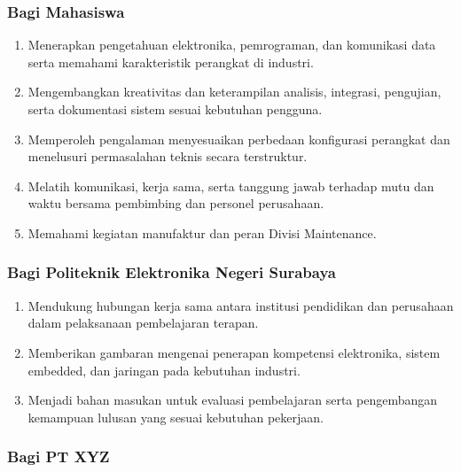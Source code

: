 \subsubsection{Bagi Mahasiswa}

\begin{enumerate}[leftmargin=*,itemsep=2pt]
\item Menerapkan pengetahuan elektronika, pemrograman, dan komunikasi data serta memahami karakteristik perangkat di industri.

\item Mengembangkan kreativitas dan keterampilan analisis, integrasi, pengujian, serta dokumentasi sistem sesuai kebutuhan pengguna.

\item Memperoleh pengalaman menyesuaikan perbedaan konfigurasi perangkat dan menelusuri permasalahan teknis secara terstruktur.

\item Melatih komunikasi, kerja sama, serta tanggung jawab terhadap mutu dan waktu bersama pembimbing dan personel perusahaan.

\item Memahami kegiatan manufaktur dan peran Divisi Maintenance.
\end{enumerate}

\subsubsection{Bagi Politeknik Elektronika Negeri Surabaya}

\begin{enumerate}[leftmargin=*,itemsep=2pt]
\item Mendukung hubungan kerja sama antara institusi pendidikan dan perusahaan dalam pelaksanaan pembelajaran terapan.

\item Memberikan gambaran mengenai penerapan kompetensi elektronika, sistem embedded, dan jaringan pada kebutuhan industri.

\item Menjadi bahan masukan untuk evaluasi pembelajaran serta pengembangan kemampuan lulusan yang sesuai kebutuhan pekerjaan.

\end{enumerate}

\subsubsection{Bagi PT XYZ}

